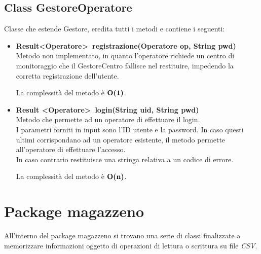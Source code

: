 \documentclass[a4paper, 12pt]{scrreprt}
\begin{document}
			\subsection{Class GestoreOperatore}
			Classe che estende Gestore, eredita tutti i metodi e contiene i seguenti:
			\begin{itemize}
				\item \textbf{Result\textless Operatore\textgreater~registrazione(Operatore op, String pwd)}
				\\Metodo non implementato, in quanto l'operatore richiede un centro di monitoraggio che il GestoreCentro fallisce nel restituire, impedendo la corretta registrazione dell'utente.
				
				La complessit\`a del metodo \`e $\mathbf{O}\textbf{(1)}$.
				
				\item \textbf{Result \textless Operatore\textgreater~login(String uid, String pwd)}
				\\Metodo che permette ad un operatore di effettuare il login.
				\\I parametri forniti in input sono l'ID utente e la password. In caso questi ultimi corrispondano ad un operatore esistente, il metodo permette all'operatore di effettuare l'accesso.
				\\In caso contrario restituisce una stringa relativa a un codice di errore.
				
				La complessit\`a del metodo \`e $\mathbf{O}\textbf{(n)}$.
			\end{itemize}

\pagebreak
		\section{Package magazzeno}
		All'interno del package magazzeno si trovano una serie di classi finalizzate a memorizzare informazioni oggetto di operazioni di lettura o scrittura su file \textsl{CSV}.
\end{document}
